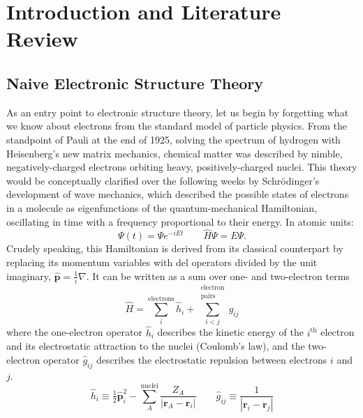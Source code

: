\chapter[%
    Introduction and Literature Review
]{%
    Introduction and Literature Review
}

\section{Naive Electronic Structure Theory}

As an entry point to electronic structure theory, let us begin by forgetting
what we know about electrons from the standard model of particle physics.
From the standpoint of Pauli at the end of 1925, solving the spectrum of
hydrogen\cite{Pauli:1926p336} with Heisenberg's new matrix
mechanics,\cite{Heisenberg:1925p879} chemical matter was described by nimble,
negatively-charged electrons orbiting heavy, positively-charged nuclei.  This
theory would be conceptually clarified over the following weeks by
Schr\"odinger's development of wave mechanics,
\cite{Schrodinger:1926p361,Schrodinger:1926p489,Schrodinger:1926p734}
which described the possible states of electrons in a molecule as eigenfunctions
of the quantum-mechanical Hamiltonian, oscillating in time with a frequency
proportional to their energy.
In atomic units:
\begin{equation}
    \Psi(t)
    =
    \Psi
    e^{-iEt}
    \qquad
    \hat{H}
    \Psi
    =
    E
    \Psi.
\end{equation}
Crudely speaking, this Hamiltonian is derived from its classical counterpart by
replacing its momentum variables with del operators divided by the unit
imaginary,
\(
    \hat{\mathbf{p}}
    =
    \frac{1}{i}
    \nabla
\).
It can be written as a sum over one- and two-electron terms
\begin{equation}
    \hat{H}
    =
    \sum_i^\text{electrons}
    \hat{h}_i
    +
    \sum_{i<j}^{\substack{\text{electron}\\\text{pairs}}}
    \hat{g}_{ij}
\end{equation}
where the one-electron operator
\(
    \hat{h}_i
\)
describes the kinetic energy of the \(i^\text{th}\) electron and its
electrostatic attraction to the nuclei (Coulomb's law), and the two-electron
operator
\(
    \hat{g}_{ij}
\)
describes the electrostatic repulsion between electrons \(i\) and \(j\).
\begin{equation}
    \hat{h}_i
    \equiv
    \tfrac{1}{2}
    \hat{\mathbf{p}}_i^2
    -
    \sum_A^\text{nuclei}
    \frac{Z_A}{|\mathbf{r}_A - \mathbf{r}_i|}
    \qquad
    \hat{g}_{ij}
    \equiv
    \frac{1}{|\mathbf{r}_i - \mathbf{r}_j|}
\end{equation}
